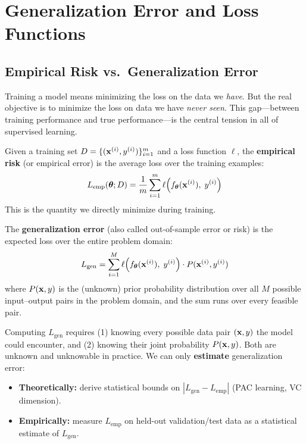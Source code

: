
\chapter*{Generalization Error and Loss Functions}

\section*{Empirical Risk vs.\ Generalization Error}

Training a model means minimizing the loss on the data we \textit{have}. But the real objective is to minimize the loss on data we have \textit{never seen}. This gap---between training performance and true performance---is the central tension in all of supervised learning.

\begin{definition}
Given a training set $D = \{(\mathbf{x}^{(i)}, y^{(i)})\}_{i=1}^{m}$ and a loss function $\ell$, the \textbf{empirical risk} (or empirical error) is the average loss over the training examples:
$$L_{\text{emp}}(\boldsymbol{\theta}; D) = \frac{1}{m} \sum_{i=1}^{m} \ell\!\left(f_{\boldsymbol{\theta}}(\mathbf{x}^{(i)}),\; y^{(i)}\right)$$
This is the quantity we directly minimize during training.
\end{definition}

\begin{definition}
The \textbf{generalization error} (also called out-of-sample error or risk) is the expected loss over the entire problem domain:
$$L_{\text{gen}} = \sum_{i=1}^{M} \ell\!\left(f_{\boldsymbol{\theta}}(\mathbf{x}^{(i)}),\; y^{(i)}\right) \cdot P(\mathbf{x}^{(i)}, y^{(i)})$$
where $P(\mathbf{x}, y)$ is the (unknown) prior probability distribution over all $M$ possible input--output pairs in the problem domain, and the sum runs over every feasible pair.
\end{definition}

\begin{remark}
Computing $L_{\text{gen}}$ requires (1) knowing every possible data pair $(\mathbf{x}, y)$ the model could encounter, and (2) knowing their joint probability $P(\mathbf{x}, y)$. Both are unknown and unknowable in practice. We can only \textbf{estimate} generalization error:
\begin{itemize}
    \item \textbf{Theoretically:} derive statistical bounds on $|L_{\text{gen}} - L_{\text{emp}}|$ (PAC learning, VC dimension).
    \item \textbf{Empirically:} measure $L_{\text{emp}}$ on held-out validation/test data as a statistical estimate of $L_{\text{gen}}$.
\end{itemize}
\end{remark}

